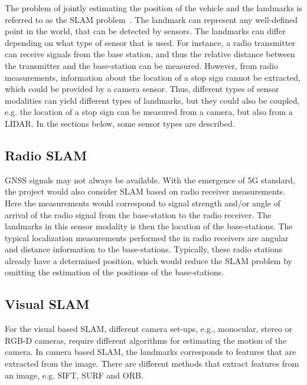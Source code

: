The problem of jointly estimating the position of the vehicle and the landmarks
is referred to as the \gls{SLAM}
problem~\cite{DBLP:journals/corr/CadenaCCLSN0L16}. The landmark can represent any
well-defined point in the world, that can be detected by sensors. The landmarks
can differ depending on what type of sensor that is used. For instance, a radio
transmitter can receive signals from the base station, and thus the relative
distance between the transmitter and the base-station can be measured. However,
from radio measurements, information about the location of a stop sign cannot
be extracted, which could be provided by a camera sensor. Thus, different types
of sensor modalities can yield different types of landmarks, but they could
also be coupled, e.g. the location of a stop sign can be measured from a
camera, but also from a \gls{LIDAR}. In the sections below, some
sensor types are described.

\subsection{Radio SLAM}

\gls{GNSS} signals may not always be available. With the emergence of 5G
standard, the project would also consider \gls{SLAM} based on radio receiver
measurements. Here the measurements would correspond to signal strength and/or
angle of arrival of the radio signal from the base-station to the radio
receiver. The landmarks in this sensor modality is then the location of the
base-stations. The typical localization measurements performed the in radio receivers
are angular and distance information to the base-stations. Typically,
these radio stations already have a determined position, which would
reduce the \gls{SLAM} problem by omitting the estimation of the
positions of the base-stations.

\subsection{Visual SLAM}

For the visual based \gls{SLAM}, different camera set-ups, e.g., monocular,
stereo or RGB-D
cameras, require different algorithms for estimating the motion of
the camera. In camera based \gls{SLAM}, the landmarks corresponds to features
that are extracted from the image. There are different methods that extract
features from an image, e.g. \gls{SIFT}\cite{Lowe:1999:ORL:850924.851523},
\gls{SURF}\cite{Bay:2008:SRF:1370312.1370556} and
\gls{ORB}\cite{Rublee:2011:OEA:2355573.2356268}.

